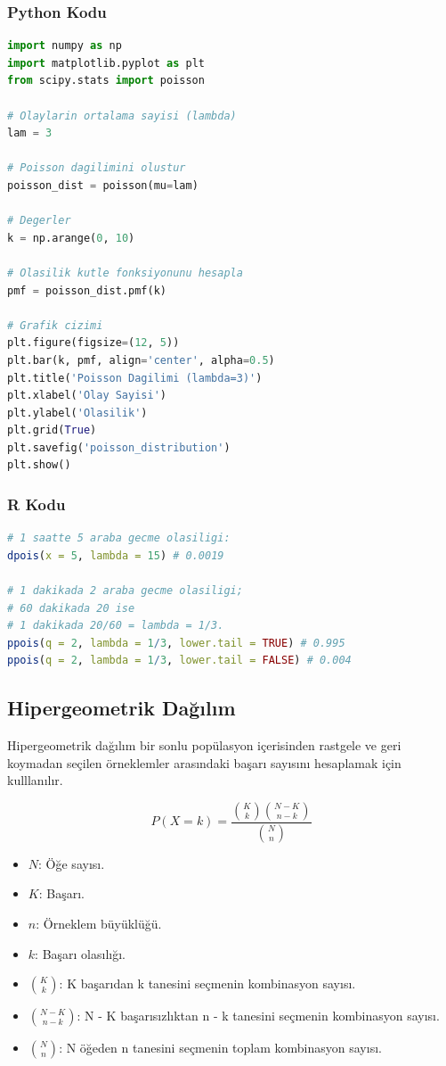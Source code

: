 \subsubsection{Python Kodu}

\begin{lstlisting}[language=Python]
import numpy as np
import matplotlib.pyplot as plt
from scipy.stats import poisson

# Olaylarin ortalama sayisi (lambda)
lam = 3

# Poisson dagilimini olustur
poisson_dist = poisson(mu=lam)

# Degerler
k = np.arange(0, 10)

# Olasilik kutle fonksiyonunu hesapla
pmf = poisson_dist.pmf(k)

# Grafik cizimi
plt.figure(figsize=(12, 5))
plt.bar(k, pmf, align='center', alpha=0.5)
plt.title('Poisson Dagilimi (lambda=3)')
plt.xlabel('Olay Sayisi')
plt.ylabel('Olasilik')
plt.grid(True)
plt.savefig('poisson_distribution')
plt.show()
\end{lstlisting}

\subsubsection{R Kodu}

\begin{lstlisting}[language=R]
# 1 saatte 5 araba gecme olasiligi:
dpois(x = 5, lambda = 15) # 0.0019

# 1 dakikada 2 araba gecme olasiligi;
# 60 dakikada 20 ise
# 1 dakikada 20/60 = lambda = 1/3.
ppois(q = 2, lambda = 1/3, lower.tail = TRUE) # 0.995
ppois(q = 2, lambda = 1/3, lower.tail = FALSE) # 0.004
\end{lstlisting}

\newpage

\subsection{Hipergeometrik  Dağılım}
Hipergeometrik dağılım bir sonlu popülasyon içerisinden rastgele ve geri koymadan seçilen örneklemler arasındaki başarı sayısını hesaplamak için kulllanılır. 

\[
P(X = k) = \frac{\binom{K}{k} \binom{N-K}{n-k}}{\binom{N}{n}}
\]

\begin{itemize}
	\item $N$: Öğe sayısı.
	\item $K$: Başarı.
	\item $n$: Örneklem büyüklüğü.
	\item $k$: Başarı olasılığı.
	\item $\binom{K}{k}$: K başarıdan k tanesini seçmenin kombinasyon sayısı.
	\item $\binom{N-K}{n-k}$: N - K başarısızlıktan n - k tanesini seçmenin kombinasyon sayısı.
	\item $\binom{N}{n}$: N öğeden n tanesini seçmenin toplam kombinasyon sayısı.
\end{itemize}

